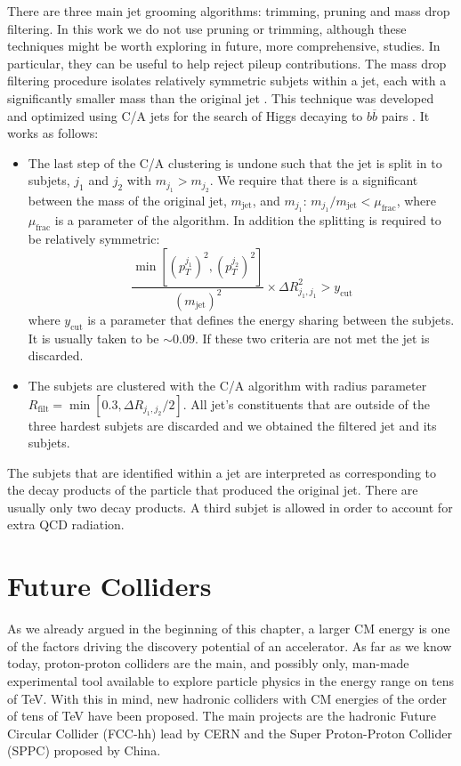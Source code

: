 There are three main jet grooming algorithms: trimming, pruning and mass drop filtering. In this work we do not use pruning or trimming, although these techniques might be worth exploring in future, more comprehensive, studies. In particular, they can be useful to help reject pileup contributions. The mass drop filtering procedure isolates relatively symmetric subjets within a jet, each with a significantly smaller mass than the original jet \cite{jetsub}. This technique was developed and optimized using C/A jets for the search of Higgs decaying to $b\overline{b}$ pairs \cite{BDRS}. It works as follows:
\begin{itemize}
	\item The last step of the C/A clustering is undone such that the jet is split in to subjets, $j_1$ and $j_2$ with $m_{j_1}>m_{j_2}$. We require that there is a significant between the mass of the original jet, $m_{\text{jet}}$, and $m_{j_1}$: $m_{j_1}/m_{\text{jet}} < \mu_{\text{frac}}$, where $\mu_{\text{frac}}$ is a parameter of the algorithm. In addition the splitting is required to be relatively symmetric:
	\begin{equation}
		\frac{\min[(p_T^{j_1})^2,(p_T^{j_2})^2]}{(m_{\text{jet}})^2} \times \Delta R_{j_1,j_1}^2 > y_{\text{cut}}
	\end{equation}
	where $y_{\text{cut}}$ is a parameter that defines the energy sharing between the subjets. It is usually taken to be $\sim 0.09$. If these two criteria are not met the jet is discarded.
	
	\item The subjets are clustered with the C/A algorithm with radius parameter $R_{\text{filt}}=\min[0.3,\Delta R_{j_1,j_2}/2]$. All jet's constituents that are outside of the three hardest subjets are discarded and we obtained the filtered jet and its subjets.
\end{itemize}

The subjets that are identified within a jet are interpreted as corresponding to the decay products of the particle that produced the original jet. There are usually only two decay products. A third subjet is allowed in order to account for extra QCD radiation.

\section{Future Colliders}
\label{section:future_colliders}

As we already argued in the beginning of this chapter, a larger CM energy is one of the factors driving the discovery potential of an accelerator. As far as we know today, proton-proton colliders are the main, and possibly only, man-made experimental tool available to explore particle physics in the energy range on tens of TeV. With this in mind, new hadronic colliders with CM energies of the order of tens of TeV have been proposed. The main projects are the hadronic Future Circular Collider (FCC-hh) lead by CERN and the Super Proton-Proton Collider (SPPC) proposed by China. 

